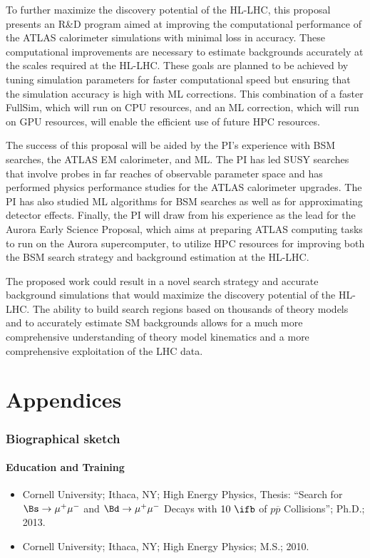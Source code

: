 \documentclass[letter, USenglish, 11pt, subfigure]{article}
\newcommand{\mm}{\ensuremath{\mu^{+}\mu^{-}}}
\newcommand{\bsmm}{\ensuremath{\Bs\to\mm}}
\newcommand{\bdmm}{\ensuremath{\Bd\to\mm}}
\begin{document}
To further maximize the discovery potential of the HL-LHC, this proposal presents an R\&D program aimed at improving the computational performance of the ATLAS calorimeter simulations with minimal loss in accuracy. These computational improvements are necessary to estimate backgrounds accurately at the scales required at the HL-LHC. These goals are planned to be achieved by tuning simulation parameters for faster computational speed but ensuring that the simulation accuracy is high with ML corrections. This combination of a faster FullSim, which will run on CPU resources, and an ML correction, which will run on GPU resources, will enable the efficient use of future HPC resources.

The success of this proposal will be aided by the PI's experience with BSM searches, the ATLAS EM calorimeter, and ML. The PI has led SUSY searches that involve probes in far reaches of observable parameter space and has performed physics performance studies for the ATLAS calorimeter upgrades. The PI has also studied ML algorithms for BSM searches as well as for approximating detector effects. Finally, the PI will draw from his experience as the lead for the Aurora Early Science Proposal, which aims at preparing ATLAS computing tasks to run on the Aurora supercomputer, to utilize HPC resources for improving both the BSM search strategy and background estimation at the HL-LHC.

The proposed work could result in a novel search strategy and accurate background simulations that would maximize the discovery potential of the HL-LHC. The ability to build search regions based on thousands of theory models and to accurately estimate SM backgrounds allows for a much more comprehensive understanding of theory model kinematics and a more comprehensive exploitation of the LHC data.


\clearpage
\appendix
\part*{Appendices}
\section{Biographical sketch}
\subsection{Education and Training}
\begin{itemize}
\item Cornell University; Ithaca, NY; High Energy Physics, Thesis: ``Search for $\bsmm$ and $\bdmm$ Decays with  $10~\ifb$ of ${p\overline{p}}$ Collisions''; Ph.D.; 2013.
\item Cornell University; Ithaca, NY; High Energy Physics; M.S.; 2010.
\end{itemize}
\end{document}
